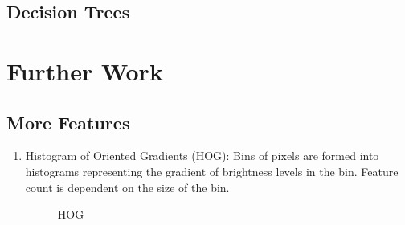 \documentclass{article}
\begin{document}
\subsection{Decision Trees}








\section{Further Work}

\subsection{More Features}

\begin{enumerate}[1.]
\item Histogram of Oriented Gradients (HOG): Bins of pixels are formed into histograms representing the gradient of brightness levels in the bin. Feature count is dependent on the size of the bin. 
\begin{figure}[H]
\centering
\setlength\fboxsep{2pt}
\setlength\fboxrule{0pt}
\caption{
HOG
}
\end{figure}


\end{enumerate}
\end{document}
